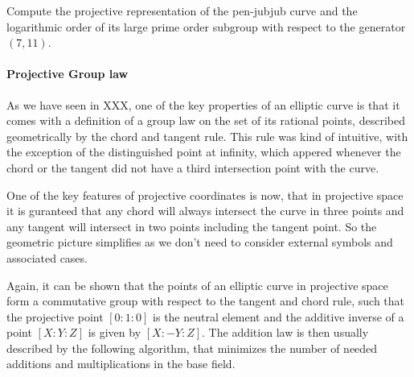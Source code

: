 \begin{exercise}
Compute the projective representation of the pen-jubjub curve and the logarithmic order of its large prime order subgroup with respect to the generator $(7,11)$.
\end{exercise}
\paragraph{Projective Group law}
As we have seen in XXX, one of the key properties of an elliptic curve is that it comes with a definition of a group law on the set of its rational points, described geometrically by the chord and tangent rule. This rule was kind of intuitive, with the exception of the distinguished point at infinity, which appered whenever the chord or the tangent did not have a third intersection point with the curve.

One of the key features of projective coordinates is now, that in projective space it is guranteed that any chord will always intersect the curve in three points and any tangent will intersect in two points including the tangent point. So the geometric picture simplifies as we don't need to consider external symbols and associated cases.

Again, it can be shown that the points of an elliptic curve in projective space form a commutative group with respect to the tangent and chord rule, such that the projective point $[0:1:0]$ is the neutral element and the additive inverse of a point $[X:Y:Z]$ is given by $[X:-Y:Z]$. The addition law is then usually described by the following algorithm, that minimizes the number of needed additions and multiplications in the base field. 

